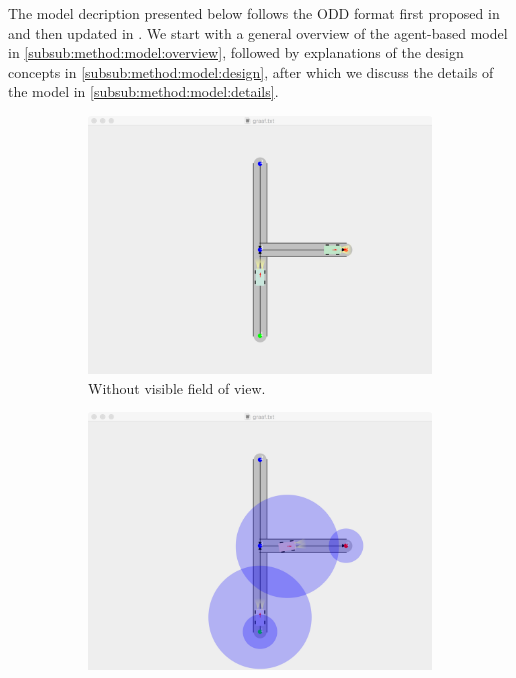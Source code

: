 The model decription presented below follows the ODD format first proposed in \textcite{grimm2006standard} and then updated in \textcite{grimm2010odd}. We start with a general overview of the agent-based model in \cref{subsub:method:model:overview}, followed by explanations of the design concepts in \cref{subsub:method:model:design}, after which we discuss the details of the model in \cref{subsub:method:model:details}. 


\begin{figure}
	\centering
	\begin{subfigure}{0.49\textwidth}
		\centering
		\includegraphics[width=\textwidth]{./img/model_simulationView}
		\caption{Without visible field of view.}
		\label{fig:model:simulation:fix}
	\end{subfigure}
	\begin{subfigure}{0.49\textwidth}
		\centering
		\includegraphics[width=\textwidth]{./img/model_simulationView_fieldOfView}

\end{subfigure}
\end{figure}
